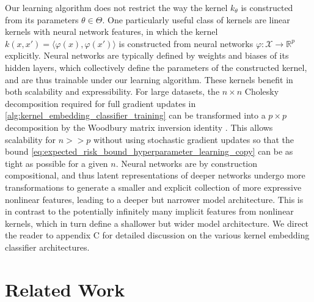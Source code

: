 \documentclass{article}
\begin{document}
	Our learning algorithm does not restrict the way the kernel $k_{\theta}$ is constructed from its parameters $\theta \in \Theta$. One particularly useful class of kernels are linear kernels with neural network features, in which the kernel $k(x, x') = \langle \varphi(x), \varphi(x') \rangle$ is constructed from neural networks $\varphi : \mathcal{X} \to \mathbb{R}^{p}$ explicitly. Neural networks are typically defined by weights and biases of its hidden layers, which collectively define the parameters of the constructed kernel, and are thus trainable under our learning algorithm. These kernels benefit in both scalability and expressibility. For large datasets, the $n \times n$ Cholesky decomposition required for full gradient updates in \cref{alg:kernel_embedding_classifier_training} can be transformed into a $p \times p$ decomposition by the Woodbury matrix inversion identity \citep{higham2002accuracy}. This allows scalability for $n >> p$ without using stochastic gradient updates so that the bound \eqref{eq:expected_risk_bound_hyperparameter_learning_copy} can be as tight as possible for a given $n$. Neural networks are by construction compositional, and thus latent representations of deeper networks undergo more transformations to generate a smaller and explicit collection of more expressive nonlinear features, leading to a deeper but narrower model architecture. This is in contrast to the potentially infinitely many implicit features from nonlinear kernels, which in turn define a shallower but wider model architecture. We direct the reader to appendix C for detailed discussion on the various kernel embedding classifier architectures. 

\section{Related Work}
\label{sec:related_work}
\end{document}

